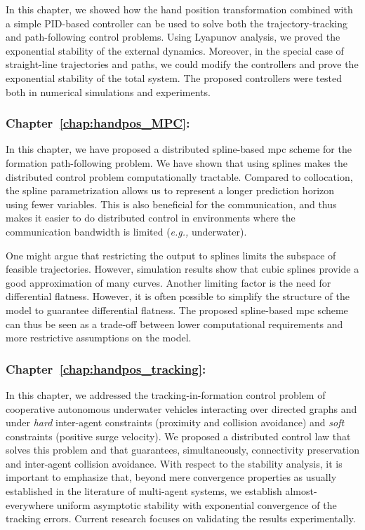 In this chapter, we showed how the hand position transformation combined with a simple PID-based controller can be used to solve both the trajectory-tracking and path-following control problems.
Using Lyapunov analysis, we proved the exponential stability of the external dynamics.
Moreover, in the special case of straight-line trajectories and paths, we could modify the controllers and prove the exponential stability of the total system.
The proposed controllers were tested both in numerical simulations and experiments.

\subsubsection{Chapter~\ref{chap:handpos_MPC}: }

In this chapter, we have proposed a distributed spline-based \gls{mpc} scheme for the formation path-following problem.
We have shown that using splines makes the distributed control problem computationally tractable.
Compared to collocation, the spline parametrization allows us to represent a longer prediction horizon using fewer variables.    
This is also beneficial for the communication, and thus makes it easier to do distributed control in environments where the communication bandwidth is limited (\emph{e.g.,} underwater).

One might argue that restricting the output to splines limits the subspace of feasible trajectories.
However, simulation results show that cubic splines provide a good approximation of many curves.
Another limiting factor is the need for differential flatness.
However, it is often possible to simplify the structure of the model to guarantee differential flatness.        
The proposed spline-based \gls{mpc} scheme can thus be seen as a trade-off between lower computational requirements and more restrictive assumptions on the model.

\subsubsection{Chapter~\ref{chap:handpos_tracking}: }

In this chapter, we addressed the tracking-in-formation control problem of cooperative autonomous underwater vehicles interacting over directed graphs and under \emph{hard} inter-agent constraints (proximity and collision avoidance) and \emph{soft} constraints (positive surge velocity). 
We proposed a distributed control law that solves this problem and that guarantees, simultaneously, connectivity preservation and inter-agent collision avoidance.
With respect to the stability analysis, it is important to emphasize that, beyond mere convergence properties as usually established in the literature of multi-agent systems, we establish almost-everywhere uniform asymptotic stability with exponential convergence of the tracking errors. 
Current research focuses on validating the results experimentally.

